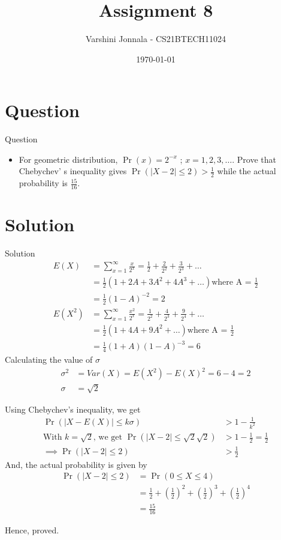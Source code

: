 \documentclass{beamer}
\title{Assignment 8}
\author{Varshini Jonnala - CS21BTECH11024}
\date{\today}
\providecommand{\pr}[1]{\ensuremath{\Pr\left(#1\right)}}
\providecommand{\brak}[1]{\ensuremath{\left(#1\right)}}
\begin{document}
\begin{frame}
    \titlepage 
\end{frame}

\section{Question}
\begin{frame}{Question}
\begin{itemize}
    \item For geometric distribution, $\pr{x} = 2^{-x}$ ; $x = 1,2,3,\dots$. Prove that Chebychev' s inequality gives $\pr{|X-2| \leq 2} > \frac{1}{2}$ while the actual probability is $\frac{15}{16}$. 
\end{itemize}
\end{frame}

\section{Solution}
\begin{frame}[allowframebreaks]{Solution}
    \begin{align}
        E(X) &= \sum_{x=1}^\infty \frac{x}{2^x} = \frac{1}{2} + \frac{2}{2^2} + \frac{3}{2^3} + \dots \\
        &= \frac{1}{2}\brak{1+2A+3A^2+4A^3+\dots} \text{where A = $\frac{1}{2}$}\\
        &= \frac{1}{2}\brak{1-A}^{-2} = 2\\
        E(X^2) &= \sum_{x=1}^\infty \frac{x^2}{2^x} = \frac{1}{2^2} + \frac{4}{2^3} + \frac{9}{2^4} + \dots \\
         &= \frac{1}{2}\brak{1+4A+9A^2+\dots} \text{where A = $\frac{1}{2}$}\\
         &= \frac{1}{4}\brak{1+A}\brak{1-A}^{-3} = 6
    \end{align}
\newpage
    Calculating the value of $\sigma$ 
    \begin{align}
        \sigma^2 &= Var(X) = E(X^2) - E(X)^2 = 6-4 = 2\\
        \sigma &= \sqrt{2}
    \end{align}
    
    Using Chebychev's inequality, we get
    \begin{align}
    \pr{|X-E(X)| \leq k\sigma} &> 1 - \frac{1}{k^2}\\
    \text{With $k=\sqrt{2}$, we get } \pr{|X-2| \leq \sqrt{2} \sqrt{2}} &> 1 - \frac{1}{2} = \frac{1}{2}\\
    \implies \pr{|X - 2| \leq 2} &> \frac{1}{2}
    \end{align}
\newpage    
    And, the actual probability is given by
    \begin{align}
        \pr{|X-2| \leq 2} &= \pr{0 \leq X \leq 4}\\
        &= \frac{1}{2}+ \brak{\frac{1}{2}}^2+\brak{\frac{1}{2}}^3+\brak{\frac{1}{2}}^4\\
        &= \frac{15}{16}
    \end{align}
    
    Hence, proved.
    
\end{frame} 
\end{document}
